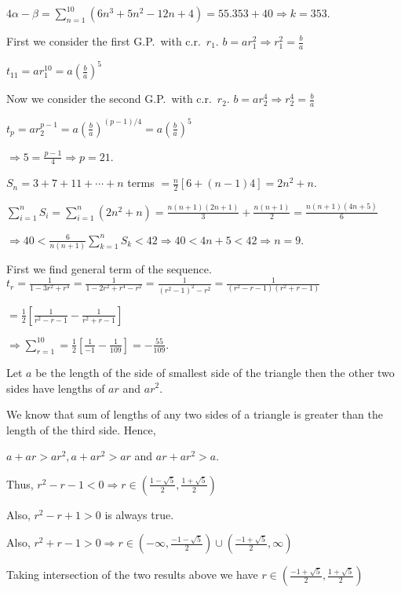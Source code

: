   $4\alpha - \beta = \displaystyle\sum_{n = 1}^{10}(6n^3 + 5n^2 - 12n + 4) = 55.353 + 40\Rightarrow k =
  353$.
\item First we consider the first G.P.\ with c.r.\ $r_1$. $b = ar_1^2\Rightarrow r_1^2 = \frac{b}{a}$

  $t_{11} = ar_1^{10} = a\left(\frac{b}{a}\right)^5$

  Now we consider the second G.P.\ with c.r.\ $r_2$. $b= ar_2^4 \Rightarrow r_2^4 = \frac{b}{a}$

  $t_p = ar_2^{p - 1} = a\left(\frac{b}{a}\right)^{(p - 1)/4} = a\left(\frac{b}{a}\right)^5$

  $\Rightarrow 5 = \frac{p - 1}{4}\Rightarrow p = 21$.
\item $S_n = 3 + 7 + 11 + \cdots + n$ terms $= \frac{n}{2}[6 + (n - 1)4] = 2n^2 + n$.

  $\displaystyle\sum_{i = 1}^nS_i = \sum_{i = 1}^n(2n^2 + n) = \frac{n(n + 1)(2n + 1)}{3} + \frac{n(n +
  1)}{2} = \frac{n(n + 1)(4n + 5)}{6}$

  $\Rightarrow 40 < \frac{6}{n(n + 1)}\displaystyle\sum_{k = 1}^nS_k < 42\Rightarrow 40 < 4n + 5 < 42
  \Rightarrow n = 9$.
\item First we find general term of the sequence. $t_r = \frac{1}{1 - 3r^2 + r^4} = \frac{1}{1 - 2r^2 + r^4
  - r^2} = \frac{1}{(r^2 - 1)^2 - r^2} = \frac{1}{(r^2 - r - 1)(r^2 + r -1)}$

  $= \frac{1}{2}\left[\frac{1}{r^2 - r - 1} - \frac{1}{r^2 + r - 1}\right]$

  $\Rightarrow \displaystyle\sum_{r = 1}^{10} = \frac{1}{2}\left[\frac{1}{-1} - \frac{1}{109}\right] =
  -\frac{55}{109}$.
\item Let $a$ be the length of the side of smallest side of the triangle then the other two sides have
  lengths of $ar$ and $ar^2$.

  We know that sum of lengths of any two sides of a triangle is greater than the length of the third
  side. Hence,

  $a + ar > ar^2, a + ar^2 > ar$ and $ar + ar^2 > a$.

  Thus, $r^2 - r - 1 < 0\Rightarrow r\in\left(\frac{1 - \sqrt{5}}{2}, \frac{1 + \sqrt{5}}{2}\right)$

  Also, $r^2 - r + 1 > 0$ is always true.

  Also, $r^2 + r - 1> 0\Rightarrow r\in\left(-\infty, \frac{-1 - \sqrt{5}}{2}\right)\cup\left(\frac{-1 +
    \sqrt{5}}{2}, \infty\right)$

  Taking intersection of the two results above we have $r\in\left(\frac{-1 + \sqrt{5}}{2}, \frac{1 +
    \sqrt{5}}{2}\right)$

